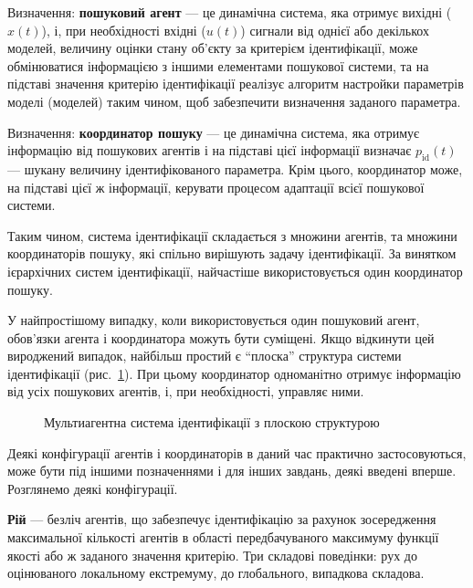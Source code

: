 \documentclass[a4paper,13pt]{atuaref}
\begin{document}

Визначення:
\textbf{пошуковий агент} --- це динамічна система, яка отримує вихідні ($x(t)$),
і, при необхідності вхідні ($u(t)$) сигнали від однієї або декількох моделей,
величину оцінки стану об'єкту за критерієм ідентифікації,
може обмінюватися інформацією з іншими елементами пошукової системи,
та на підставі значення критерію
ідентифікації реалізує алгоритм настройки параметрів моделі (моделей) таким
чином, щоб забезпечити визначення заданого параметра.

Визначення:
\textbf{координатор пошуку} --- це динамічна система, яка отримує інформацію
від пошукових агентів і на підставі цієї інформації визначає
$p_{\mathrm{id}}(t)$ --- шукану величину ідентифікованого параметра.
Крім цього, координатор може, на підставі цієї ж інформації,
керувати процесом адаптації всієї пошукової системи.

Таким чином, система ідентифікації складається з множини агентів, та
множини координаторів пошуку, які спільно вирішують задачу ідентифікації.
За винятком ієрархічних систем ідентифікації, найчастіше використовується один координатор пошуку.

У найпростішому випадку, коли використовується один пошуковий агент, обов'язки
агента і координатора можуть бути суміщені. Якщо відкинути цей вироджений
випадок, найбільш простий є ``плоска'' структура системи ідентифікації (рис.~\ref{atu:f:agents_flat}).
При цьому координатор одноманітно отримує
інформацію від усіх пошукових агентів, і, при необхідності, управляє ними.

\begin{figure}[htb!]
\begin{center}

\end{center}
\caption{Мультиагентна система ідентифікації з плоскою структурою}
\label{atu:f:agents_flat}
\end{figure}

Деякі конфігурації агентів і координаторів в даний час практично
застосовуються, може бути під іншими позначеннями і для інших завдань, деякі
введені вперше. Розглянемо деякі конфігурації.

\textbf{Рій} --- безліч агентів, що забезпечує ідентифікацію за рахунок
зосередження максимальної кількості агентів в області передбачуваного максимуму
функції якості або ж заданого значення критерію. Три складові поведінки: рух
до оцінюваного локальному екстремуму, до глобального, випадкова складова.
\end{document}
